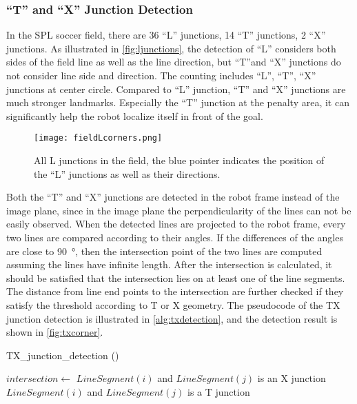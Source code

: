 \subsubsection{``T'' and ``X'' Junction Detection}
In the \gls{SPL} soccer field, there are 36 ``L'' junctions, 14 ``T'' junctions, 2 ``X'' junctions. As illustrated in \autoref{fig:ljunctions}, the detection of ``L'' considers both sides of the field line as well as the line direction, but ``T''and ``X'' junctions do not consider line side and direction. The counting includes ``L'', ``T'', ``X'' junctions at center circle. Compared to ``L'' junction, ``T'' and ``X'' junctions are much stronger landmarks. Especially the ``T'' junction at the penalty area, it can significantly help the robot localize itself in front of the goal.

\begin{figure}[h!]
  \centering
  \texttt{[image: fieldLcorners.png]}
  \caption[All L junctions in the field.]{All L junctions in the field, the blue pointer indicates the position of the ``L'' junctions as well as their directions.}
  \label{fig:ljunctions}
\end{figure}

Both the ``T'' and ``X'' junctions are detected in the robot frame instead of the image plane, since in the image plane the perpendicularity of the lines can not be easily observed. When the detected lines are projected to the robot frame, every two lines are compared according to their angles. If the differences of the angles are close to \SI{90}{\degree}, then the intersection point of the two lines are computed assuming the lines have infinite length. After the intersection is calculated, it should be satisfied that the intersection lies on at least one of the line segments. The distance from line end points to the intersection are further checked if they satisfy the threshold according to T or X geometry. The pseudocode of the TX junction detection is illustrated in \autoref{alg:txdetection}, and the detection result is shown in \autoref{fig:txcorner}.

\begin{algorithm}                      
  \caption{TX\_junction\_detection ()}         %
\label{alg:txdetection}                           
\begin{algorithmic}[1]                    
		\State $intersection \gets$ 
				\State $LineSegment(i)$ and $LineSegment(j)$ is an X junction
			\EndIf
				\State $LineSegment(i)$ and $LineSegment(j)$ is a T junction
			\EndIf
		    \EndIf
		\EndIf
	\EndFor
  \EndFor
\end{algorithmic}
\end{algorithm}

